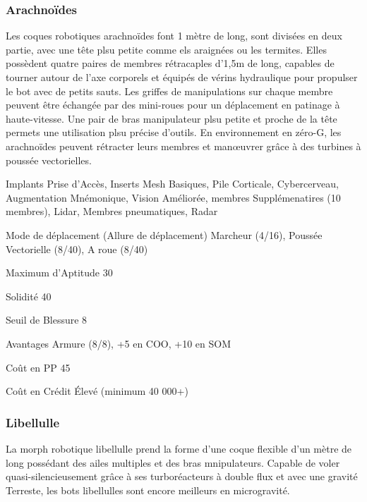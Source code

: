 \subsubsection{Arachnoïdes} \label{sec:starting-arachnoids} 

Les coques robotiques arachnoïdes font 1 mètre de long, sont divisées en deux partie, avec une tête plsu petite comme els araignées ou les termites. Elles possèdent quatre paires de membres rétracaples d'1,5m de long, capables de tourner autour de l'axe corporels et équipés de vérins hydraulique pour propulser le bot avec de petits sauts. Les griffes de manipulations sur chaque membre peuvent être échangée par des mini-roues pour un déplacement en patinage à haute-vitesse. Une pair de bras manipulateur plsu petite et proche de la tête permets une utilisation plsu précise d'outils. En environnement en zéro-G, les arachnoïdes peuvent rétracter leurs membres et manœuvrer grâce à des turbines à poussée vectorielles. 

\begin{description*} 
   \item[Implants] Prise d'Accès, Inserts Mesh Basiques, Pile Corticale, Cybercerveau, Augmentation Mnémonique, Vision Améliorée, membres Supplémenatires (10 membres), Lidar, Membres pneumatiques, Radar
   \item[Mode de déplacement](Allure de déplacement) Marcheur (4/16), Poussée Vectorielle (8/40), A roue (8/40)
   \item[Maximum d'Aptitude] 30
   \item[Solidité] 40
   \item[Seuil de Blessure] 8
   \item[Avantages] Armure (8/8), +5 en COO, +10 en SOM
   \item[Coût en PP] 45
   \item[Coût en Crédit] Élevé (minimum 40 000+)
\end{description*} 

\subsubsection{Libellulle} \label{sec:starting-dragonfly} 

La morph robotique libellulle prend la forme d'une coque flexible d'un mètre de long possédant des ailes multiples et des bras mnipulateurs. Capable de voler quasi-silencieusement grâce à ses turboréacteurs à double flux et avec une gravité Terreste, les bots libellulles sont encore meilleurs en microgravité. 

